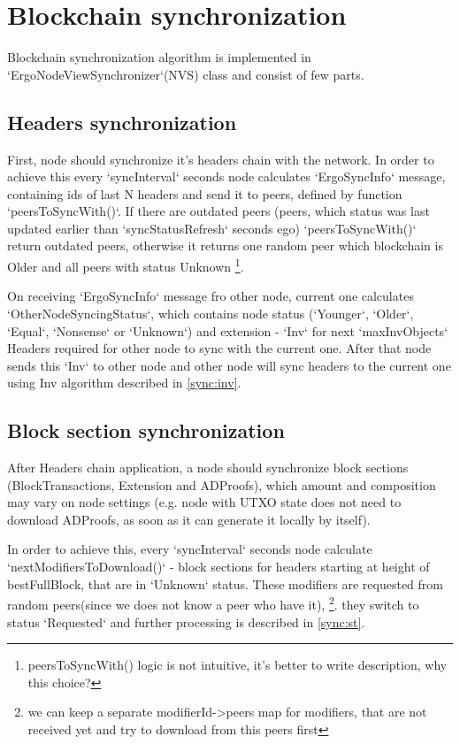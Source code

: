 \section{Blockchain synchronization}
Blockchain synchronization algorithm is implemented in `ErgoNodeViewSynchronizer`(NVS) class and consist of few parts.

\subsection{Headers synchronization}

First, node should synchronize it's headers chain with the network.
In order to achieve this every `syncInterval` seconds node calculates `ErgoSyncInfo` message,
containing ids of last N headers and send it to peers, defined by function `peersToSyncWith()`.
If there are outdated peers (peers, which status
was last updated earlier than `syncStatusRefresh` seconds ego) `peersToSyncWith()` return outdated peers,
otherwise it returns one random peer which blockchain is Older and all peers with status Unknown
\footnote{peersToSyncWith() logic is not intuitive, it's better to write description, why this choice?}.

On receiving `ErgoSyncInfo` message fro other node, current one calculates `OtherNodeSyncingStatus`,
which contains node status (`Younger`, `Older`, `Equal`, `Nonsense` or `Unknown`) and extension -
`Inv` for next `maxInvObjects` Headers required for other node to sync with the current one.
After that node sends this `Inv` to other node and other node will sync headers to the current one
using Inv algorithm described in \ref{sync:inv}.

\subsection{Block section synchronization}

After Headers chain application, a node should synchronize block sections
(BlockTransactions, Extension and ADProofs), which amount and composition
may vary on node settings (e.g. node with UTXO state does not need to download ADProofs,
as soon as it can generate it locally by itself).

In order to achieve this, every `syncInterval` seconds node calculate `nextModifiersToDownload()` -
block sections for headers starting at height of bestFullBlock, that are in `Unknown` status.
These modifiers are requested from random peers(since we does not know a peer who have it),
\footnote{we can keep a separate modifierId->peers map for modifiers, that are not received yet and try to download from this peers first}.
they switch to status `Requested` and further processing is described in \ref{sync:st}.

